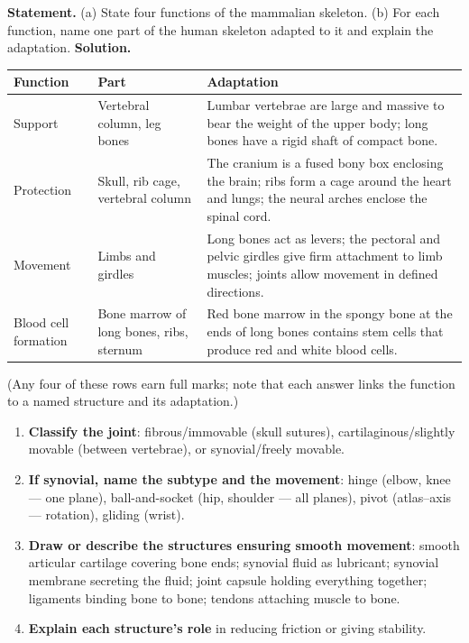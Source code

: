 \documentclass[11pt]{article}
\newcommand{\cle}[1]{{\popxbold\color{popdark}#1}}
\begin{document}
\begin{exoresolu}
\textbf{Statement.} (a) State four functions of the mammalian skeleton. (b) For each function, name one part of the human skeleton adapted to it and explain the adaptation.
\tcblower
\textbf{Solution.}
\begin{center}
\begin{tabularx}{\linewidth}{|l|X|X|}
\hline
\rowcolor{popblueL} \textbf{Function} & \textbf{Part} & \textbf{Adaptation} \\
\hline
Support & Vertebral column, leg bones & Lumbar vertebrae are large and massive to bear the weight of the upper body; long bones have a rigid shaft of compact bone. \\
\hline
Protection & Skull, rib cage, vertebral column & The cranium is a fused bony box enclosing the brain; ribs form a cage around the heart and lungs; the neural arches enclose the spinal cord. \\
\hline
Movement & Limbs and girdles & Long bones act as levers; the pectoral and pelvic girdles give firm attachment to limb muscles; joints allow movement in defined directions. \\
\hline
Blood cell formation & Bone marrow of long bones, ribs, sternum & Red bone marrow in the spongy bone at the ends of long bones contains stem cells that produce red and white blood cells. \\
\hline
\end{tabularx}
\end{center}
(Any four of these rows earn full marks; note that each answer links the function to a named structure and its adaptation.)
\end{exoresolu}

\begin{methode}
\begin{enumerate}
\item \textbf{Classify the joint}: fibrous/immovable (skull sutures), cartilaginous/slightly movable (between vertebrae), or \cle{synovial}/freely movable.
\item \textbf{If synovial, name the subtype and the movement}: hinge (elbow, knee --- one plane), ball-and-socket (hip, shoulder --- all planes), pivot (atlas--axis --- rotation), gliding (wrist).
\item \textbf{Draw or describe the structures ensuring smooth movement}: smooth \cle{articular cartilage} covering bone ends; \cle{synovial fluid} as lubricant; synovial membrane secreting the fluid; joint capsule holding everything together; ligaments binding bone to bone; tendons attaching muscle to bone.
\item \textbf{Explain each structure's role} in reducing friction or giving stability.
\end{enumerate}
\end{methode}
\end{document}
